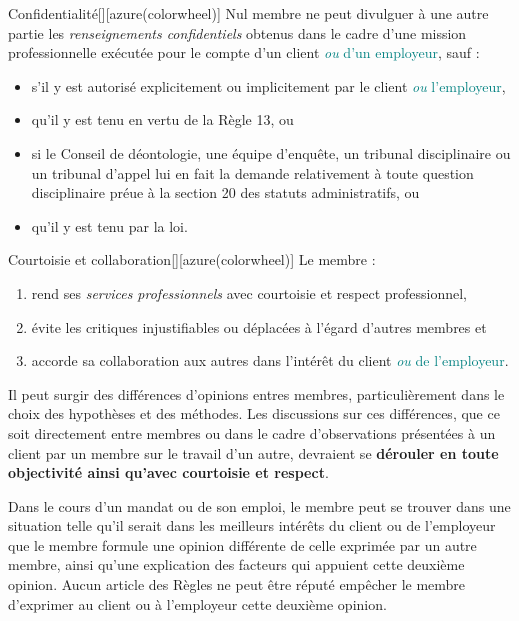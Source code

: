 \documentclass[10pt, french]{article}
\begin{document}
\begin{multicols*}{2}
\bigskip

\begin{definitionGENERAL}{Confidentialité}[][azure(colorwheel)]
Nul membre ne peut divulguer à une autre partie les \og \textit{renseignements confidentiels} \fg{} obtenus dans le cadre d'une mission professionnelle exécutée pour le compte d'un client \textcolor{teal}{\textit{ou} d'un employeur}, sauf :
\begin{itemize}
	\item	s'il y est autorisé explicitement ou implicitement par le client \textcolor{teal}{\textit{ou} l'employeur}, 
	\item	qu'il y est tenu en vertu de la Règle 13, ou
	\item	si le Conseil de déontologie, une équipe d'enquête, un tribunal disciplinaire ou un tribunal d'appel lui en fait la demande relativement à toute question disciplinaire préue à la section 20 des statuts administratifs, ou
	\item	qu'il y est tenu par la loi.
\end{itemize}
\end{definitionGENERAL}

\begin{definitionGENERAL}{Courtoisie et collaboration}[][azure(colorwheel)]
Le membre :
\begin{enumerate}
	\item	rend ses \og \textit{services professionnels} \fg{} avec courtoisie et respect professionnel, 
	\item	évite les critiques injustifiables ou déplacées à l'égard d'autres membres et 
	\item	accorde sa collaboration aux autres dans l'intérêt du client \textcolor{teal}{\textit{ou} de l'employeur}.
\end{enumerate}
\end{definitionGENERAL}

\begin{definitionNOHFILLsub}[Annotation 8-1]
Il peut surgir des différences d’opinions entres membres, particulièrement dans le choix des hypothèses et des méthodes. Les discussions sur ces différences, que ce soit directement entre membres ou dans le cadre d’observations présentées à un client par un membre sur le travail d’un autre, devraient se \textbf{dérouler en toute objectivité ainsi qu’avec courtoisie et respect}.
\end{definitionNOHFILLsub}

\begin{definitionNOHFILLsub}[Annotation 8-2]
Dans le cours d’un mandat ou de son emploi, le membre peut se trouver dans une situation telle qu’il serait dans les meilleurs intérêts du client ou de l’employeur que le membre formule une opinion différente de celle exprimée par un autre membre, ainsi qu’une explication des facteurs qui appuient cette deuxième opinion. Aucun article des Règles ne peut être réputé empêcher le membre d’exprimer au client ou à l’employeur cette deuxième opinion.
\end{definitionNOHFILLsub}


\end{multicols*}
\end{document}

